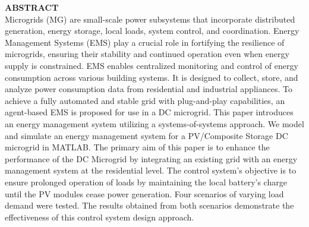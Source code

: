 \textbf{ABSTRACT}
\vspace{0.2cm}\vspace{0.2cm}\vspace{0.2cm}\vspace{0.2cm}
\\\relax
Microgrids (MG) are small-scale power subsystems that incorporate distributed generation, energy storage, local loads, system control, and coordination. Energy Management Systems (EMS) play a crucial role in fortifying the resilience of microgrids, ensuring their stability and continued operation even when energy supply is constrained. EMS enables centralized monitoring and control of energy consumption across various building systems. It is designed to collect, store, and analyze power consumption data from residential and industrial appliances.
To achieve a fully automated and stable grid with plug-and-play capabilities, an agent-based EMS is proposed for use in a DC microgrid. This paper introduces an energy management system utilizing a systems-of-systems approach. We model and simulate an energy management system for a PV/Composite Storage DC microgrid in MATLAB. The primary aim of this paper is to enhance the performance of the DC Microgrid by integrating an existing grid with an energy management system at the residential level. The control system's objective is to ensure prolonged operation of loads by maintaining the local battery's charge until the PV modules cease power generation. Four scenarios of varying load demand were tested. The results obtained from both scenarios demonstrate the effectiveness of this control system design approach.